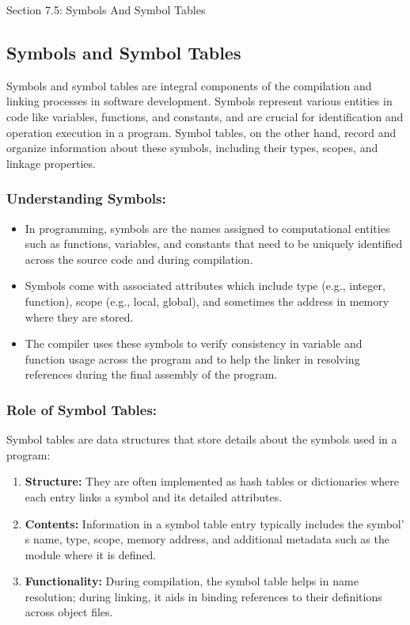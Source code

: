 \begin{notes}{Section 7.5: Symbols And Symbol Tables}
    \subsection*{Symbols and Symbol Tables}

    Symbols and symbol tables are integral components of the compilation and linking processes in software development. Symbols represent various entities in code like variables, functions, and constants, 
    and are crucial for identification and operation execution in a program. Symbol tables, on the other hand, record and organize information about these symbols, including their types, scopes, and 
    linkage properties. \vspace*{1em}
    
    \subsubsection*{Understanding Symbols:}
    
    \begin{itemize}
        \item In programming, symbols are the names assigned to computational entities such as functions, variables, and constants that need to be uniquely identified across the source code and during compilation.
        \item Symbols come with associated attributes which include type (e.g., integer, function), scope (e.g., local, global), and sometimes the address in memory where they are stored.
        \item The compiler uses these symbols to verify consistency in variable and function usage across the program and to help the linker in resolving references during the final assembly of the program.
    \end{itemize}
    
    \subsubsection*{Role of Symbol Tables:}
    
    Symbol tables are data structures that store details about the symbols used in a program:
    \begin{enumerate}
        \item \textbf{Structure:} They are often implemented as hash tables or dictionaries where each entry links a symbol and its detailed attributes.
        \item \textbf{Contents:} Information in a symbol table entry typically includes the symbol' s name, type, scope, memory address, and additional metadata such as the module where it is defined.
        \item \textbf{Functionality:} During compilation, the symbol table helps in name resolution; during linking, it aids in binding references to their definitions across object files.
    \end{enumerate}
    

\end{notes}
